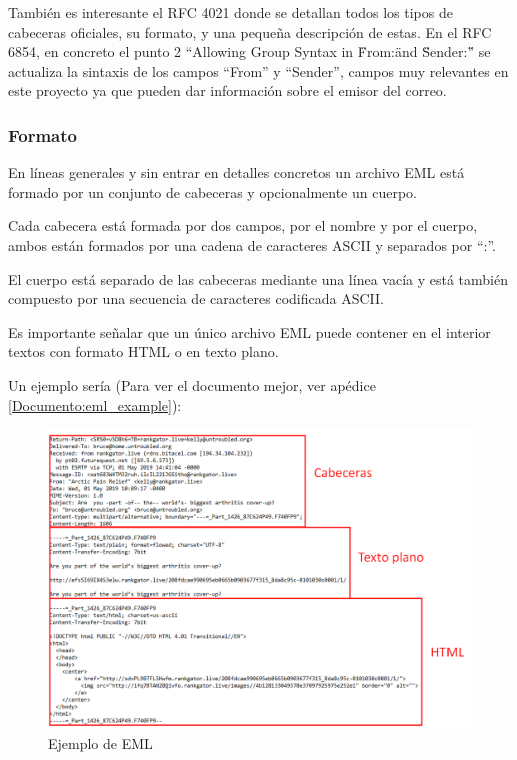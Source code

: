 También es interesante el RFC 4021\cite{rfc4021} donde se detallan todos los tipos de cabeceras oficiales, su formato, y una pequeña descripción de estas. En el RFC 6854\cite{rfc6854}, en concreto el punto 2 “Allowing Group Syntax in \"From:\" and \"Sender:\"” se actualiza la sintaxis de los campos “From” y “Sender”, campos muy relevantes en este proyecto ya que pueden dar información sobre el emisor del correo.

\subsubsection{Formato}
En líneas generales y sin entrar en detalles concretos un archivo EML está formado por un conjunto de cabeceras y opcionalmente un cuerpo. 

Cada cabecera está formada por dos campos, por el nombre y por el cuerpo, ambos están formados por una cadena de caracteres ASCII y separados por “:”.

El cuerpo está separado de las cabeceras mediante una línea vacía y está también compuesto por una secuencia de caracteres codificada ASCII. 

Es importante señalar que un único archivo EML puede contener en el interior textos con formato HTML o en texto plano.

Un ejemplo sería (Para ver el documento mejor, ver apédice \ref{Documento:eml_example}): 

\begin{figure}[H]
    \centering
    \includegraphics[scale=0.45]{imagenes/eml_example.png}
\caption{Ejemplo de EML}
\end{figure}


